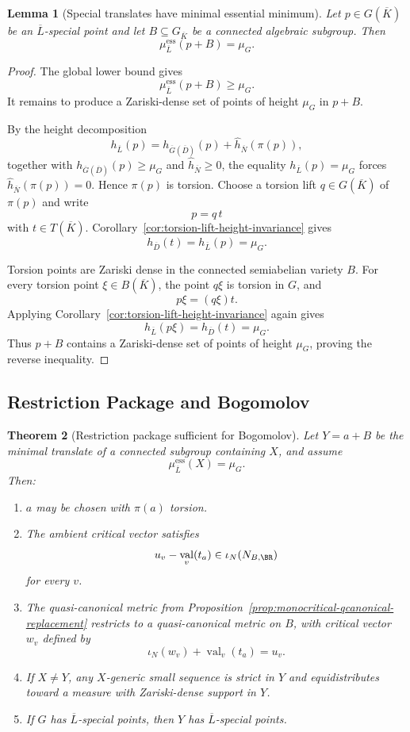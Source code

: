 \documentclass[10pt,a4paper]{amsart}
\theoremstyle{plain}
\newtheorem{theorem}{Theorem}
\newtheorem{lemma}[theorem]{Lemma}
\DeclareMathOperator{\val}{val}
\theoremstyle{plain}
\numberwithin{equation}{section}
\providecommand{\bD}{\overline{D}}
\providecommand{\bL}{\overline{L}}
\providecommand{\bN}{\overline{N}}
\providecommand{\muess}{\mu^{\mathrm{ess}}}
\begin{document}
\begin{lemma}[Special translates have minimal essential minimum]\label{lem:special-translate-min}
	Let \(p\in G(\overline{K})\) be an \(\bL\)-special point and let \(B\subseteq G_{\overline{K}}\)
	be a connected algebraic subgroup.  Then
	\[
	\muess_{\bL}(p+B)=\mu_G.
	\]
\end{lemma}

\begin{proof}
	The global lower bound gives
	\[
	\muess_{\bL}(p+B)\ge\mu_G.
	\]
	It remains to produce a Zariski-dense set of points of height \(\mu_G\) in
	\(p+B\).
	
	By the height decomposition
	\[
	h_{\bL}(p)=h_{\overline G(\bD)}(p)+\hat h_{\bN}(\pi(p)),
	\]
	together with \(h_{\overline G(\bD)}(p)\ge\mu_G\) and
	\(\hat h_{\bN}\ge0\), the equality \(h_{\bL}(p)=\mu_G\) forces
	\(\hat h_{\bN}(\pi(p))=0\).  Hence \(\pi(p)\) is torsion.
	Choose a torsion lift \(q\in G(\overline{K})\) of \(\pi(p)\) and write
	\[
	p=q\,t
	\]
	with \(t\in T(\overline{K})\).  Corollary~\ref{cor:torsion-lift-height-invariance}
	gives
	\[
	h_{\bD}(t)=h_{\bL}(p)=\mu_G.
	\]
	
	Torsion points are Zariski dense in the connected semiabelian variety \(B\).
	For every torsion point \(\xi\in B(\overline{K})\), the point \(q\xi\) is torsion in
	\(G\), and
	\[
	p\xi=(q\xi)t.
	\]
	Applying Corollary~\ref{cor:torsion-lift-height-invariance} again gives
	\[
	h_{\bL}(p\xi)=h_{\bD}(t)=\mu_G.
	\]
	Thus \(p+B\) contains a Zariski-dense set of points of height \(\mu_G\), proving
	the reverse inequality.
\end{proof}

\subsection{Restriction Package and Bogomolov}

\begin{theorem}[Restriction package sufficient for Bogomolov]\label{thm:restriction-package}
	Let \(Y=a+B\) be the minimal translate of a connected subgroup containing
	\(X\), and assume
	\[
	\muess_{\bL}(X)=\mu_G.
	\]
	Then:
	\begin{enumerate}[label=(\arabic*),leftmargin=2em]
		\item \(a\) may be chosen with \(\pi(a)\) torsion.
		\item The ambient critical vector satisfies
		\[
		u_v-\val_v(t_a)\in \iota_N(N_{B,\BR})
		\]
		for every \(v\).
		\item The quasi-canonical metric from
		Proposition~\ref{prop:monocritical-qcanonical-replacement} restricts to a
		quasi-canonical
		metric on \(B\), with critical vector \(w_v\) defined by
		\[
		\iota_N(w_v)+\val_v(t_a)=u_v.
		\]
		\item If \(X\neq Y\), any \(X\)-generic small sequence is strict in \(Y\) and
		equidistributes toward a measure with Zariski-dense support in \(Y\).
		\item If \(G\) has \(\bL\)-special points, then \(Y\) has \(\bL\)-special
		points.
	\end{enumerate}
\end{theorem}
\end{document}
